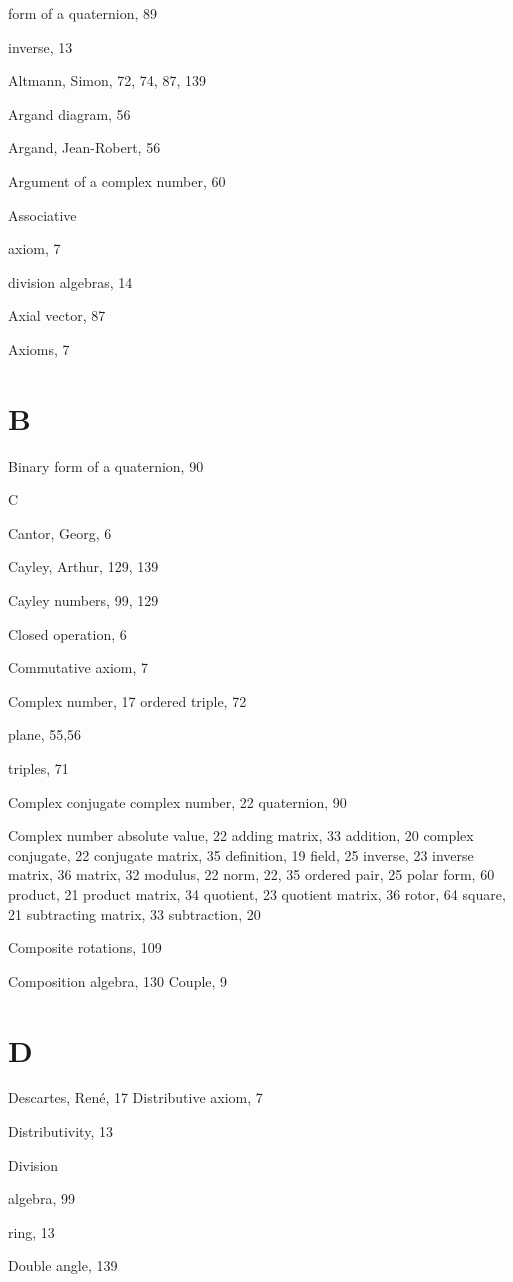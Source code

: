 \documentclass[10pt]{article}
\begin{document}
form of a quaternion, 89

inverse, 13

Altmann, Simon, 72, 74, 87, 139

Argand diagram, 56

Argand, Jean-Robert, 56

Argument of a complex number, 60

Associative

axiom, 7

division algebras, 14

Axial vector, 87

Axioms, 7

\section{B}
Binary form of a quaternion, 90

C

Cantor, Georg, 6

Cayley, Arthur, 129, 139

Cayley numbers, 99, 129

Closed operation, 6

Commutative axiom, 7

Complex number, 17 ordered triple, 72

plane, 55,56

triples, 71

Complex conjugate complex number, 22 quaternion, 90

Complex number absolute value, 22 adding matrix, 33 addition, 20 complex conjugate, 22 conjugate matrix, 35 definition, 19 field, 25 inverse, 23 inverse matrix, 36 matrix, 32 modulus, 22 norm, 22, 35 ordered pair, 25 polar form, 60 product, 21 product matrix, 34 quotient, 23 quotient matrix, 36 rotor, 64 square, 21 subtracting matrix, 33 subtraction, 20

Composite rotations, 109

Composition algebra, 130 Couple, 9

\section{D}
Descartes, René, 17 Distributive axiom, 7

Distributivity, 13

Division

algebra, 99

ring, 13

Double angle, 139
\end{document}

